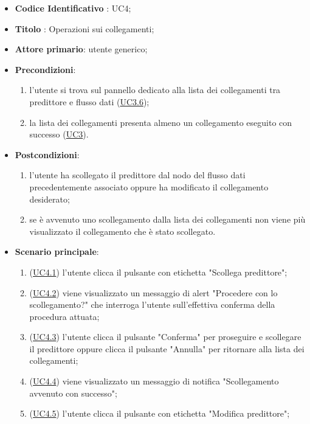 		\begin{itemize}
			\item\textbf{Codice Identificativo} : UC4;
			\item\textbf{Titolo} : Operazioni sui collegamenti;
			\item\textbf{Attore primario}: utente generico;
			\item\textbf{Precondizioni}:
				\begin{enumerate}
					\item l'utente si trova sul pannello dedicato alla lista dei collegamenti tra predittore e flusso dati (\hyperref[par:UC3.6]{UC3.6});
					\item la lista dei collegamenti presenta almeno un collegamento eseguito con successo (\hyperref[par:UC3]{UC3}).
				\end{enumerate}
			\item\textbf{Postcondizioni}:
				\begin{enumerate}
					\item l'utente ha scollegato il predittore dal nodo del flusso dati precedentemente associato oppure ha modificato il collegamento desiderato;
					\item se è avvenuto uno scollegamento dalla lista dei collegamenti non viene più visualizzato il collegamento che è stato scollegato.
				\end{enumerate}
			\item\textbf{Scenario principale}: 
			\begin{enumerate} 
				\item (\hyperref[par:UC4.1]{UC4.1}) l'utente clicca il pulsante con etichetta "Scollega predittore";
				\item (\hyperref[par:UC4.2]{UC4.2}) viene visualizzato un messaggio di alert "Procedere con lo scollegamento?" che interroga l'utente sull'effettiva conferma della procedura attuata;
				\item (\hyperref[par:UC4.3]{UC4.3}) l'utente clicca il pulsante "Conferma" per proseguire e scollegare il predittore oppure clicca il pulsante "Annulla" per ritornare alla lista dei collegamenti;	
				\item (\hyperref[par:UC4.4]{UC4.4}) viene visualizzato un messaggio di notifica "Scollegamento avvenuto con successo";
				\item (\hyperref[par:UC4.5]{UC4.5}) l'utente clicca il pulsante con etichetta "Modifica predittore";
			\end{enumerate}
	\end{itemize}
		
